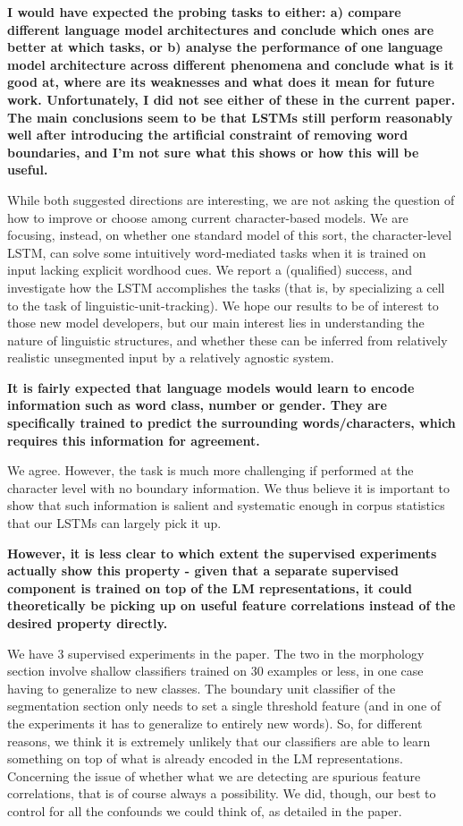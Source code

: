 \documentclass{article}[11pt,a4paper,oneside]
\begin{document}
\textbf{I would have expected the probing tasks to either:
a) compare different language model architectures and conclude which ones
are better at which tasks, or
b) analyse the performance of one language model architecture across
different phenomena and conclude what is it good at, where are its
weaknesses and what does it mean for future work.
Unfortunately, I did not see either of these in the current paper. The main
conclusions seem to be that LSTMs still perform reasonably well after
introducing the artificial constraint of removing word boundaries, and I'm
not sure what this shows or how this will be useful.}

While both suggested directions are interesting, we are not asking the question of how to improve or choose among current character-based models. We are focusing, instead, on whether one standard model of this sort, the character-level LSTM, can solve some intuitively word-mediated tasks when it is trained on input lacking explicit wordhood cues. We report a (qualified) success, and investigate how the LSTM accomplishes the tasks (that is, by specializing a cell to the task of linguistic-unit-tracking). We hope our results to be of interest to those new model developers, but our main interest lies in understanding the nature of linguistic structures, and whether these can be inferred from relatively realistic unsegmented input by a relatively agnostic system.\newline

\textbf{It is fairly expected that language models would learn to encode information
such as word class, number or gender. They are specifically trained to
predict the surrounding words/characters, which requires this information
for agreement.}

We agree. However, the task is much more challenging if performed at the character level with no boundary information. We thus believe it is important to show that such information is salient and systematic enough in corpus statistics that our LSTMs can largely pick it up.\newline

\textbf{However, it is less clear to which extent the supervised
experiments actually show this property - given that a separate supervised
component is trained on top of the LM representations, it could
theoretically be picking up on useful feature correlations instead of the
desired property directly.}

We have 3 supervised experiments in the paper. The two in the morphology section involve shallow classifiers trained on 30 examples or less, in one case having to generalize to new classes. The boundary unit classifier of the segmentation section only needs to set a single threshold feature (and in one of the experiments it has to generalize to entirely new words). So, for different reasons, we think it is extremely unlikely that our classifiers are able to learn something on top of what is already encoded in the LM representations. Concerning the issue of whether what we are detecting are spurious feature correlations, that is of course always a possibility. We did, though, our best to control for all the confounds we could think of, as detailed in the paper.\newline
\end{document}
